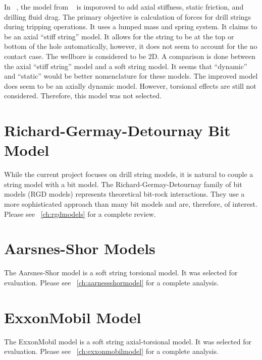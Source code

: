 In ~\cite{ref:zamanipour2018a}, the model from  ~\cite{ref:miska2015a} is imporoved to add axial stiffness, static friction, and drilling fluid drag.  The primary objective is calculation of forces for drill strings during tripping operations.  It uses a lumped mass and spring system.  It claims to be an axial ``stiff string'' model.  It allows for the string to be at the top or bottom of the hole automatically, however, it does not seem to account for the no contact case.  The wellbore is considered to be 2D.  A comparison is done between the axial ``stiff string'' model and a soft string model.  It seems that ``dynamic'' and ``static'' would be better nomenclature for these models.  The improved model does seem to be an axially dynamic model.  However, torsional effects are still not considered.  Therefore, this model was not selected.

\section{Richard-Germay-Detournay Bit Model}
While the current project focuses on drill string models, it is natural to couple a string model with a bit model. The Richard-Germay-Detournay family of bit models (RGD models) represents theoretical bit-rock interactions.  They use a more sophisticated approach than many bit models and are, therefore, of interest.  Please see \chaptername~\ref{ch:rgdmodels} for a complete review.

\section{Aarsnes-Shor Models}
The Aarsnes-Shor model is a soft string torsional model.  It was selected for evaluation.  Please see \chaptername~\ref{ch:aarnessshormodel} for a complete analysis.

\section{ExxonMobil Model}
The ExxonMobil model is a soft string axial-torsional model.  It was selected for evaluation.  Please see \chaptername~\ref{ch:exxonmobilmodel} for a complete analysis. 